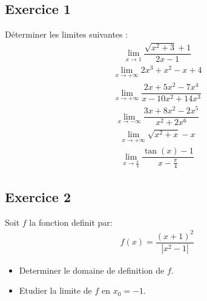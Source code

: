 \documentclass[letterpaper,10pt,french]{jupyterBook}
\begin{document}
\subsection{Exercice 1}
\label{\detokenize{exo3:exercice-1}}
\sphinxAtStartPar
Déterminer les limites suivantes :
\begin{equation*}
\begin{split}
\lim_{x\to 1} \dfrac{\sqrt{x^2+3}+1}{2x-1}
\end{split}
\end{equation*}\begin{equation*}
\begin{split}
\lim_{x\to +\infty} 2x^3+x^2-x+4
\end{split}
\end{equation*}\begin{equation*}
\begin{split}
\lim_{x\to +\infty} \dfrac{2x+5x^2-7x^4}{x-10x^2 + 14x^3}
\end{split}
\end{equation*}\begin{equation*}
\begin{split}
\lim_{x\to -\infty} \dfrac{3x+8x^2-2x^5}{x^2+2x^6}
\end{split}
\end{equation*}\begin{equation*}
\begin{split}
\lim_{x\to +\infty} \sqrt{x^2+x} -x
\end{split}
\end{equation*}\begin{equation*}
\begin{split}
\lim_{x\to \frac{\pi}{4}}\dfrac{\tan (x) - 1}{x- \frac{\pi}{4}}
\end{split}
\end{equation*}

\subsection{Exercice 2}
\label{\detokenize{exo3:exercice-2}}
\sphinxAtStartPar
Soit \(f\) la fonction definit par:
\begin{equation*}
\begin{split}
f(x) = \dfrac{(x+1)^2}{|x^2-1|}
\end{split}
\end{equation*}\begin{itemize}
\item {} 
\sphinxAtStartPar
Determiner le domaine de definition de \(f\).

\item {} 
\sphinxAtStartPar
Etudier la limite de \(f\) en \(x_0 = -1\).

\end{itemize}
\end{document}
